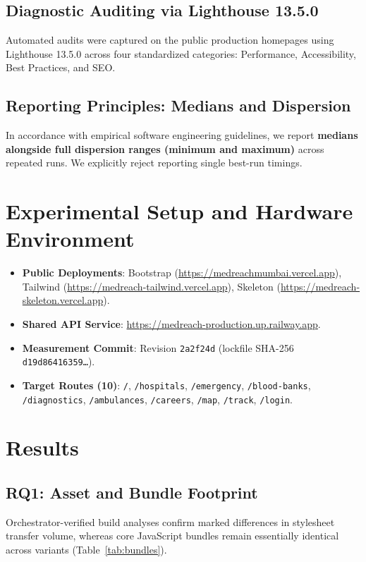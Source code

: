 \documentclass[conference]{IEEEtran}
\begin{document}
\subsection{Diagnostic Auditing via Lighthouse 13.5.0}
Automated audits were captured on the public production homepages using Lighthouse 13.5.0 across four standardized categories: Performance, Accessibility, Best Practices, and SEO.

\subsection{Reporting Principles: Medians and Dispersion}
In accordance with empirical software engineering guidelines, we report \textbf{medians alongside full dispersion ranges (minimum and maximum)} across repeated runs. We explicitly reject reporting single best-run timings.

\section{Experimental Setup and Hardware Environment}
\begin{itemize}
    \item \textbf{Public Deployments}:
    Bootstrap (\url{https://medreachmumbai.vercel.app}),
    Tailwind (\url{https://medreach-tailwind.vercel.app}),
    Skeleton (\url{https://medreach-skeleton.vercel.app}).
    \item \textbf{Shared API Service}: \url{https://medreach-production.up.railway.app}.
    \item \textbf{Measurement Commit}: Revision \texttt{2a2f24d} (lockfile SHA-256 \texttt{d19d86416359\dots}).
    \item \textbf{Target Routes (10)}: \texttt{/}, \texttt{/hospitals}, \texttt{/emergency}, \texttt{/blood-banks}, \texttt{/diagnostics}, \texttt{/ambulances}, \texttt{/careers}, \texttt{/map}, \texttt{/track}, \texttt{/login}.
\end{itemize}

\section{Results}

\subsection{RQ1: Asset and Bundle Footprint}
Orchestrator-verified build analyses confirm marked differences in stylesheet transfer volume, whereas core JavaScript bundles remain essentially identical across variants (Table~\ref{tab:bundles}).
\end{document}
